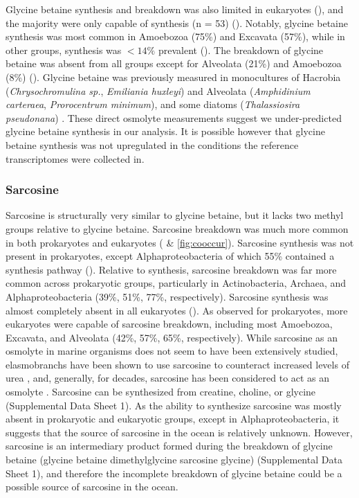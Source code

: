 \documentclass[utf8]{frontiersSCNS} %
\begin{document}
Glycine betaine synthesis and breakdown was also limited in eukaryotes (), and the majority were only capable of synthesis (n = 53) (). Notably, glycine betaine synthesis was most common in Amoebozoa (75\%) and Excavata (57\%), while in other groups, synthesis was $< 14\%$ prevalent (). The breakdown of glycine betaine was absent from all groups except for Alveolata (21\%) and Amoebozoa (8\%) (). Glycine betaine was previously measured in monocultures of Hacrobia (\textit{Chrysochromulina sp.}, \textit{Emiliania huxleyi}) and Alveolata (\textit{Amphidinium carteraea}, \textit{Prorocentrum minimum}), and some diatoms (\textit{Thalassiosira pseudonana}) \citep{Gebser2013,Keller1999,Keller1999.2}. These direct osmolyte measurements suggest we under-predicted glycine betaine synthesis in our analysis. It is possible however that glycine betaine synthesis was not upregulated in the conditions the reference transcriptomes were collected in. 

\subsubsection*{Sarcosine}
Sarcosine is structurally very similar to glycine betaine, but it lacks two methyl groups relative to glycine betaine. Sarcosine breakdown was much more common in both prokaryotes and eukaryotes ( \& \ref{fig:cooccur}). Sarcosine synthesis was not present in prokaryotes, except Alphaproteobacteria of which 55\% contained a synthesis pathway (). Relative to synthesis, sarcosine breakdown was far more common across prokaryotic groups, particularly in Actinobacteria, Archaea, and Alphaproteobacteria (39\%, 51\%, 77\%, respectively). Sarcosine synthesis was almost completely absent in all eukaryotes (). As observed for prokaryotes, more eukaryotes were capable of sarcosine breakdown, including most Amoebozoa, Excavata, and Alveolata (42\%, 57\%, 65\%, respectively). While sarcosine as an osmolyte in marine organisms does not seem to have been extensively studied, elasmobranchs have been shown to use sarcosine to counteract increased levels of urea \citep{Treberg2006}, and, generally, for decades, sarcosine has been considered to act as an osmolyte \citep{Arakawa1985}. Sarcosine can be synthesized from creatine, choline, or glycine (Supplemental Data Sheet 1). As the ability to synthesize sarcosine was mostly absent in prokaryotic and eukaryotic groups, except in Alphaproteobacteria, it suggests that the source of sarcosine in the ocean is relatively unknown. However, sarcosine is an intermediary product formed during the breakdown of glycine betaine (glycine betaine \textrightarrow dimethylglycine \textrightarrow  sarcosine \textrightarrow glycine) (Supplemental Data Sheet 1), and therefore the incomplete breakdown of glycine betaine could be a possible source of sarcosine in the ocean.
\end{document}
